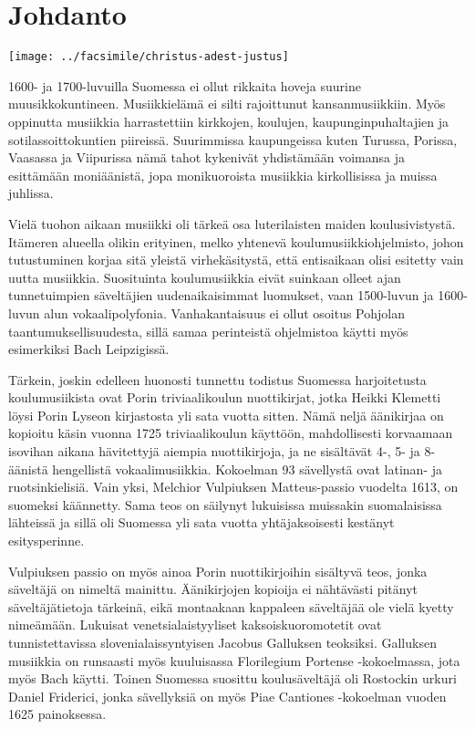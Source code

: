 \chapter*{Johdanto}

\texttt{[image: ../facsimile/christus-adest-justus]}


1600- ja 1700-luvuilla Suomessa ei ollut rikkaita hoveja suurine muusikkokuntineen. Musiikkielämä ei silti rajoittunut kansanmusiikkiin. Myös oppinutta musiikkia harrastettiin kirkkojen, koulujen, kaupunginpuhaltajien ja sotilassoittokuntien piireissä. Suurimmissa kaupungeissa kuten Turussa, Porissa, Vaasassa ja Viipurissa nämä tahot kykenivät yhdistämään voimansa ja esittämään moniäänistä, jopa monikuoroista musiikkia kirkollisissa ja muissa juhlissa.

Vielä tuohon aikaan musiikki oli tärkeä osa luterilaisten maiden koulusivistystä. Itämeren alueella olikin erityinen, melko yhtenevä koulumusiikkiohjelmisto, johon tutustuminen korjaa sitä yleistä virhekäsitystä, että entisaikaan olisi esitetty vain uutta musiikkia. Suosituinta koulumusiikkia eivät suinkaan olleet ajan tunnetuimpien säveltäjien uudenaikaisimmat luomukset, vaan 1500-luvun ja 1600-luvun alun vokaalipolyfonia. Vanhakantaisuus ei ollut osoitus Pohjolan taantumukselli­suudesta, sillä samaa perinteistä ohjelmistoa käytti myös esimerkiksi Bach Leipzigissä.

Tärkein, joskin edelleen huonosti tunnettu todistus Suomessa harjoitetusta koulumusiikista ovat Porin triviaalikoulun nuottikirjat, jotka Heikki Klemetti löysi Porin Lyseon kirjastosta yli sata vuotta sitten. Nämä neljä äänikirjaa on kopioitu käsin vuonna 1725 triviaalikoulun käyttöön, mahdollisesti korvaamaan isovihan aikana hävitettyjä aiempia nuottikirjoja, ja ne sisältävät 4-, 5- ja 8-äänistä hengellistä vokaalimusiikkia. Kokoelman 93 sävellystä ovat latinan- ja ruotsinkielisiä. Vain yksi, Melchior Vulpiuksen Matteus-passio vuodelta 1613, on suomeksi käännetty. Sama teos on säilynyt lukuisissa muissakin suomalaisissa lähteissä ja sillä oli Suomessa yli sata vuotta yhtäjaksoisesti kestänyt esitysperinne.

Vulpiuksen passio on myös ainoa Porin nuottikirjoihin sisältyvä teos, jonka säveltäjä on nimeltä mainittu. Äänikirjojen kopioija ei nähtävästi pitänyt säveltäjätietoja tärkeinä, eikä montaakaan kappaleen säveltäjää ole vielä kyetty nimeämään. Lukuisat venetsialaistyyliset kaksoiskuoromotetit ovat tunnistettavissa slovenialaissyntyisen Jacobus Galluksen teoksiksi. Galluksen musiikkia on runsaasti myös kuuluisassa Florilegium Portense -kokoelmassa, jota myös Bach käytti. Toinen Suomessa suosittu koulusäveltäjä oli Rostockin urkuri Daniel Friderici, jonka sävellyksiä on myös Piae Cantiones -kokoelman vuoden 1625 painoksessa.

